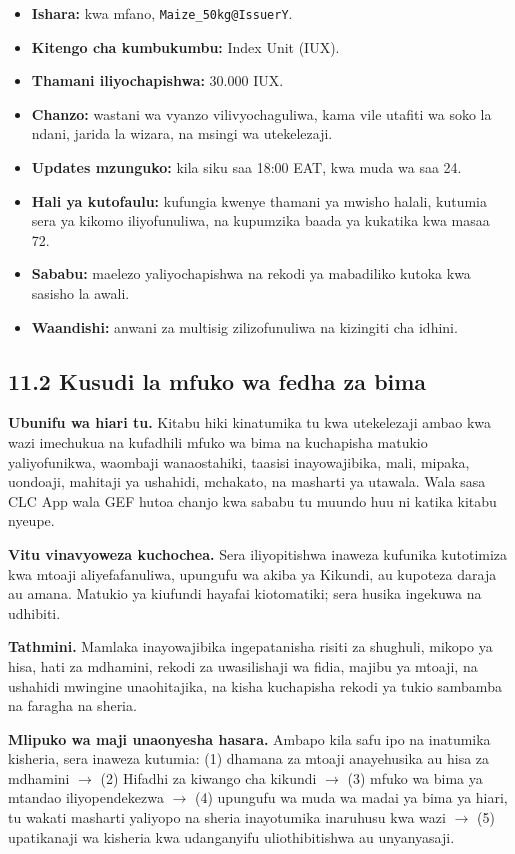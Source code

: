 \documentclass[11pt]{article}
\begin{document}
\begin{itemize}[leftmargin=*]
\item \textbf{Ishara:} kwa mfano, \texttt{Maize\_50kg@IssuerY}.
\item \textbf{Kitengo cha kumbukumbu:} Index Unit (IUX).
\item \textbf{Thamani iliyochapishwa:} 30.000 IUX.
\item \textbf{Chanzo:} wastani wa vyanzo vilivyochaguliwa, kama vile utafiti wa soko la ndani, jarida la wizara, na msingi wa utekelezaji.
\item \textbf{Updates mzunguko:} kila siku saa 18:00 EAT, kwa muda wa saa 24.
\item \textbf{Hali ya kutofaulu:} kufungia kwenye thamani ya mwisho halali, kutumia sera ya kikomo iliyofunuliwa, na kupumzika baada ya kukatika kwa masaa 72.
\item \textbf{Sababu:} maelezo yaliyochapishwa na rekodi ya mabadiliko kutoka kwa sasisho la awali.
\item \textbf{Waandishi:} anwani za multisig zilizofunuliwa na kizingiti cha idhini.
\end{itemize}
\subsection*{11.2 Kusudi la mfuko wa fedha za bima}

\textbf{Ubunifu wa hiari tu.} Kitabu hiki kinatumika tu kwa utekelezaji ambao kwa wazi imechukua na kufadhili mfuko wa bima na kuchapisha matukio yaliyofunikwa, waombaji wanaostahiki, taasisi inayowajibika, mali, mipaka, uondoaji, mahitaji ya ushahidi, mchakato, na masharti ya utawala. Wala sasa CLC App wala GEF hutoa chanjo kwa sababu tu muundo huu ni katika kitabu nyeupe.

\textbf{Vitu vinavyoweza kuchochea.} Sera iliyopitishwa inaweza kufunika kutotimiza kwa mtoaji aliyefafanuliwa, upungufu wa akiba ya Kikundi, au kupoteza daraja au amana. Matukio ya kiufundi hayafai kiotomatiki; sera husika ingekuwa na udhibiti.

\textbf{Tathmini.} Mamlaka inayowajibika ingepatanisha risiti za shughuli, mikopo ya hisa, hati za mdhamini, rekodi za uwasilishaji wa fidia, majibu ya mtoaji, na ushahidi mwingine unaohitajika, na kisha kuchapisha rekodi ya tukio sambamba na faragha na sheria.

\textbf{Mlipuko wa maji unaonyesha hasara.} Ambapo kila safu ipo na inatumika kisheria, sera inaweza kutumia: (1) dhamana za mtoaji anayehusika au hisa za mdhamini $\to$ (2) Hifadhi za kiwango cha kikundi $\to$ (3) mfuko wa bima ya mtandao iliyopendekezwa $\to$ (4) upungufu wa muda wa madai ya bima ya hiari, tu wakati masharti yaliyopo na sheria inayotumika inaruhusu kwa wazi $\to$ (5) upatikanaji wa kisheria kwa udanganyifu uliothibitishwa au unyanyasaji.
\end{document}
